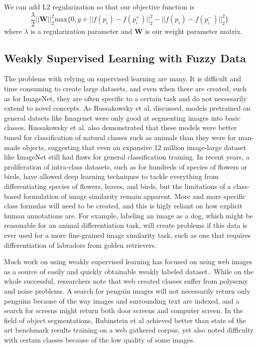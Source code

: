 We can add L2 regularization so that our objective function is
\begin{equation}
\dfrac{\lambda}{2}||\mathbf{W}||_2^2 \text{max}\{0, g + ||f(p_i) - f(p_i^+)||_2^2 - ||f(p_i)-f(p_i^-)||_2^2\}
\end{equation}
where $\lambda$ is a regularization parameter and $\mathbf{W}$ is our weight parameter matrix.


\subsection{Weakly Supervised Learning with Fuzzy Data}
The problems with relying on supervised learning are many. It is difficult and time consuming to create large datasets, and even when these are created, such as for ImageNet, they are often specific to a certain task and do not necessarily extend to novel concepts. As Russakowsky et al. discussed\cite{russakovsky2013detecting}, models pretrained on general datsets like Imagenet were only good at segmenting images into basic classes. Russakowsky et al. also demonstrated that these models were better tuned for classification of natural classes such as animals than they were for man-made objects, suggesting that even an expansive 12 million image-large dataset like ImageNet still had flaws for general classification training. In recent years, a proliferation of intra-class datasets, such as for hundreds of species of flowers or birds, have allowed deep learning techniques to tackle everything from differentiating species of flowers\cite{angelova2013image}, leaves\cite{rejeb2013vantage}, and birds\cite{berg2014birdsnap}, but the limitations of a class-based formulation of image similarity remain apparent. More and more specific class formulas will need to be created, and this is higly reliant on how explicit human annotations are. For example, labeling an image as a dog, which might be reasonable for an animal differentiation task, will create problems if this data is ever used for a more fine-grained image similarity task, such as one that requires differentiation of labradors from golden retrievers.

Much work on using weakly supervised learning has focused on using web images as a source of easily and quickly obtainable weakly labeled dataset.\cite{bergamo2010exploiting}\cite{fergus2010learning}\cite{li2010optimol}\cite{schroff2011harvesting}. While on the whole successful, researchers note that web created classes suffer from polysemy and noise problems. A search for penguin images will not necessarily return only penguins because of the way images and surrounding text are indexed, and a search for screens might return both door screens and computer screen. In the field of object segmentations, Rubinstein et al achieved better than state of the art benchmark results training on a web gathered corpus, yet also noted difficulty with certain classes because of the low quality of some images.\cite{rubinstein2013unsupervised}

